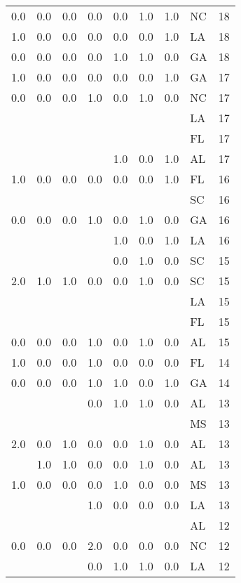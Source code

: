 \begin{tabular}{llllllllr}
0.0 & 0.0 & 0.0 & 0.0 & 0.0 & 1.0 & 1.0 & NC &    18 \\
1.0 & 0.0 & 0.0 & 0.0 & 0.0 & 0.0 & 1.0 & LA &    18 \\
0.0 & 0.0 & 0.0 & 0.0 & 1.0 & 1.0 & 0.0 & GA &    18 \\
1.0 & 0.0 & 0.0 & 0.0 & 0.0 & 0.0 & 1.0 & GA &    17 \\
0.0 & 0.0 & 0.0 & 1.0 & 0.0 & 1.0 & 0.0 & NC &    17 \\
    &     &     &     &     &     &     & LA &    17 \\
    &     &     &     &     &     &     & FL &    17 \\
    &     &     &     & 1.0 & 0.0 & 1.0 & AL &    17 \\
1.0 & 0.0 & 0.0 & 0.0 & 0.0 & 0.0 & 1.0 & FL &    16 \\
    &     &     &     &     &     &     & SC &    16 \\
0.0 & 0.0 & 0.0 & 1.0 & 0.0 & 1.0 & 0.0 & GA &    16 \\
    &     &     &     & 1.0 & 0.0 & 1.0 & LA &    16 \\
    &     &     &     & 0.0 & 1.0 & 0.0 & SC &    15 \\
2.0 & 1.0 & 1.0 & 0.0 & 0.0 & 1.0 & 0.0 & SC &    15 \\
    &     &     &     &     &     &     & LA &    15 \\
    &     &     &     &     &     &     & FL &    15 \\
0.0 & 0.0 & 0.0 & 1.0 & 0.0 & 1.0 & 0.0 & AL &    15 \\
1.0 & 0.0 & 0.0 & 1.0 & 0.0 & 0.0 & 0.0 & FL &    14 \\
0.0 & 0.0 & 0.0 & 1.0 & 1.0 & 0.0 & 1.0 & GA &    14 \\
    &     &     & 0.0 & 1.0 & 1.0 & 0.0 & AL &    13 \\
    &     &     &     &     &     &     & MS &    13 \\
2.0 & 0.0 & 1.0 & 0.0 & 0.0 & 1.0 & 0.0 & AL &    13 \\
    & 1.0 & 1.0 & 0.0 & 0.0 & 1.0 & 0.0 & AL &    13 \\
1.0 & 0.0 & 0.0 & 0.0 & 1.0 & 0.0 & 0.0 & MS &    13 \\
    &     &     & 1.0 & 0.0 & 0.0 & 0.0 & LA &    13 \\
    &     &     &     &     &     &     & AL &    12 \\
0.0 & 0.0 & 0.0 & 2.0 & 0.0 & 0.0 & 0.0 & NC &    12 \\
    &     &     & 0.0 & 1.0 & 1.0 & 0.0 & LA &    12 \\

\end{tabular}
